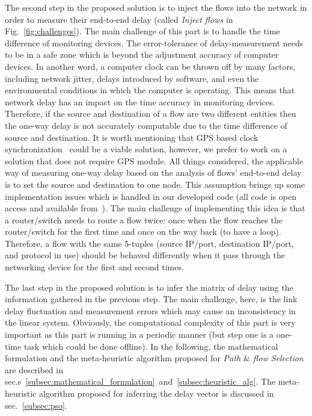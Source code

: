 \documentclass[10pt, journal, letterpaper]{IEEEtran}
\begin{document}
The second step in the proposed solution is to inject the flows into the network in order to measure their end-to-end delay (called \textit{Inject flows} in Fig.~\ref{fig:challenges}). The main challenge of this part is to handle the time difference of monitoring devices. The error-tolerance of delay-measurement needs to be in a safe zone which is beyond the adjustment accuracy of computer devices. In another word, a computer clock can be thrown off by many factors, including network jitter, delays introduced by software, and even the environmental conditions in which the computer is operating. This means that network delay has an impact on the time accuracy in monitoring devices. Therefore, if the source and destination of a flow are two different entities then the one-way delay is not accurately computable due to the time difference of source and destination. It is worth mentioning that GPS based clock synchronization~\cite{tian2020high} could be a viable solution, however, we prefer to work on a solution that does not require GPS module.%
All things considered, the applicable way of measuring one-way delay based on the analysis of flows' end-to-end delay is to set the source and destination to one node. This assumption brings up some implementation issues which is handled in our developed code (all code is open access and available from~\cite{monitoringCodeOurImplementation}). The main challenge of implementing this idea is that a router/switch needs to route a flow twice: once when the flow reaches the router/switch for the first time and once on the way back (to have a loop). Therefore, a flow with the same 5-tuples (source IP/port, destination IP/port,  and protocol in use) should be behaved differently when it pass through the networking device for the first and second times.

The last step in the proposed solution is to infer the matrix of delay using the information gathered in the previous step. The main challenge, here, is the link delay fluctuation and measurement errors which may cause an inconsistency in the linear system. Obviously, the computational complexity of this part is very important as this part is running in a periodic manner (but step one is a one-time task which could be done offline). In the following, the mathematical formulation and the meta-heuristic algorithm proposed for \textit{Path $\&$ flow Selection} are described in sec.s~\ref{subsec:mathematical_formulation}~and~\ref{subsec:heuristic_alg}. The meta-heuristic algorithm proposed for inferring the delay vector is discussed in sec.~\ref{subsec:pso}.
\end{document}
